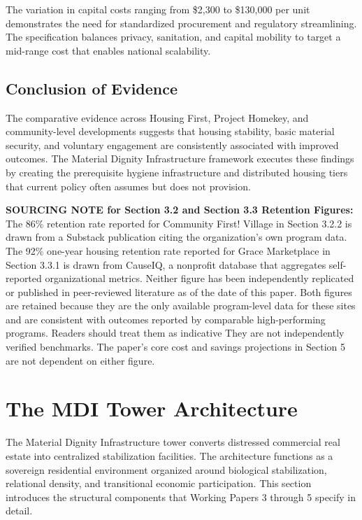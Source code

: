 \documentclass[12pt, letterpaper]{article}
\begin{document}
The variation in capital costs ranging from \$2,300 to \$130,000 per unit demonstrates the need for standardized procurement and regulatory streamlining. The specification balances privacy, sanitation, and capital mobility to target a mid-range cost that enables national scalability.

\subsection{Conclusion of Evidence}

The comparative evidence across Housing First, Project Homekey, and community-level developments suggests that housing stability, basic material security, and voluntary engagement are consistently associated with improved outcomes. The Material Dignity Infrastructure framework executes these findings by creating the prerequisite hygiene infrastructure and distributed housing tiers that current policy often assumes but does not provision.

\noindent\textbf{SOURCING NOTE for Section 3.2 and Section 3.3 Retention Figures:}\\
The 86\% retention rate reported for Community First! Village in Section 3.2.2 is drawn from a Substack publication citing the organization's own program data. The 92\% one-year housing retention rate reported for Grace Marketplace in Section 3.3.1 is drawn from CauseIQ, a nonprofit database that aggregates self-reported organizational metrics. Neither figure has been independently replicated or published in peer-reviewed literature as of the date of this paper. Both figures are retained because they are the only available program-level data for these sites and are consistent with outcomes reported by comparable high-performing programs. Readers should treat them as indicative They are not independently verified benchmarks. The paper's core cost and savings projections in Section 5 are not dependent on either figure.


\section{The MDI Tower Architecture}

The Material Dignity Infrastructure tower converts distressed commercial real estate into centralized stabilization facilities. The architecture functions as a sovereign residential environment organized around biological stabilization, relational density, and transitional economic participation. This section introduces the structural components that Working Papers 3 through 5 specify in detail.
\end{document}
